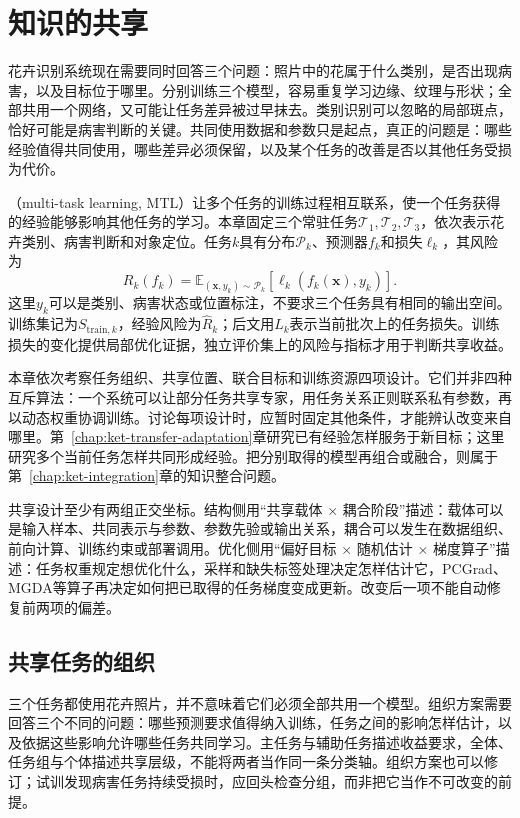 \chapter{知识的共享}
\label{chap:ket-sharing}

花卉识别系统现在需要同时回答三个问题：照片中的花属于什么类别，是否出现病害，以及目标位于哪里。分别训练三个模型，容易重复学习边缘、纹理与形状；全部共用一个网络，又可能让任务差异被过早抹去。类别识别可以忽略的局部斑点，恰好可能是病害判断的关键。共同使用数据和参数只是起点，真正的问题是：哪些经验值得共同使用，哪些差异必须保留，以及某个任务的改善是否以其他任务受损为代价。

（multi-task learning, MTL）让多个任务的训练过程相互联系，使一个任务获得的经验能够影响其他任务的学习。本章固定三个常驻任务$\mathcal T_1,\mathcal T_2,\mathcal T_3$，依次表示花卉类别、病害判断和对象定位。任务$k$具有分布$\mathcal P_k$、预测器$f_k$和损失$\ell_k$，其风险为
\begin{equation}
  R_k(f_k)=
  \mathbb E_{(\bm{x},y_k)\sim\mathcal P_k}
  [\ell_k(f_k(\bm{x}),y_k)].
  \label{eq:ket-sharing-task-risk}
\end{equation}
这里$y_k$可以是类别、病害状态或位置标注，不要求三个任务具有相同的输出空间。训练集记为$S_{\mathrm{train},k}$，经验风险为$\hat R_k$；后文用$L_k$表示当前批次上的任务损失。训练损失的变化提供局部优化证据，独立评价集上的风险与指标才用于判断共享收益。

本章依次考察任务组织、共享位置、联合目标和训练资源四项设计。它们并非四种互斥算法：一个系统可以让部分任务共享专家，用任务关系正则联系私有参数，再以动态权重协调训练。讨论每项设计时，应暂时固定其他条件，才能辨认改变来自哪里。第~\ref{chap:ket-transfer-adaptation}章研究已有经验怎样服务于新目标；这里研究多个当前任务怎样共同形成经验。把分别取得的模型再组合或融合，则属于第~\ref{chap:ket-integration}章的知识整合问题。

共享设计至少有两组正交坐标。结构侧用“共享载体 × 耦合阶段”描述：载体可以是输入样本、共同表示与参数、参数先验或输出关系，耦合可以发生在数据组织、前向计算、训练约束或部署调用。优化侧用“偏好目标 × 随机估计 × 梯度算子”描述：任务权重规定想优化什么，采样和缺失标签处理决定怎样估计它，PCGrad、MGDA等算子再决定如何把已取得的任务梯度变成更新。改变后一项不能自动修复前两项的偏差。

\section{共享任务的组织}
\label{sec:ket-sharing-organization}

三个任务都使用花卉照片，并不意味着它们必须全部共用一个模型。组织方案需要回答三个不同的问题：哪些预测要求值得纳入训练，任务之间的影响怎样估计，以及依据这些影响允许哪些任务共同学习。主任务与辅助任务描述收益要求，全体、任务组与个体描述共享层级，不能将两者当作同一条分类轴。组织方案也可以修订；试训发现病害任务持续受损时，应回头检查分组，而非把它当作不可改变的前提。

